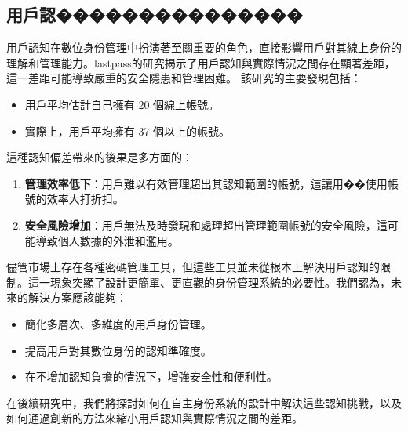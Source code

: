 \subsection{用戶認���������������}
用戶認知在數位身份管理中扮演著至關重要的角色，直接影響用戶對其線上身份的理解和管理能力。lastpass\cite{lastpass2020psychology}的研究揭示了用戶認知與實際情況之間存在顯著差距，這一差距可能導致嚴重的安全隱患和管理困難。\newline
該研究的主要發現包括：
\begin{itemize}
  \item 用戶平均估計自己擁有 20 個線上帳號。
  \item 實際上，用戶平均擁有 37 個以上的帳號。
\end{itemize}
這種認知偏差帶來的後果是多方面的：
\begin{enumerate}
  \item \textbf{管理效率低下}：用戶難以有效管理超出其認知範圍的帳號，這讓用��使用帳號的效率大打折扣。
  \item \textbf{安全風險增加}：用戶無法及時發現和處理超出管理範圍帳號的安全風險，這可能導致個人數據的外泄和濫用。
\end{enumerate}
儘管市場上存在各種密碼管理工具，但這些工具並未從根本上解決用戶認知的限制。這一現象突顯了設計更簡單、更直觀的身份管理系統的必要性。我們認為，未來的解決方案應該能夠：
\begin{itemize}
  \item 簡化多層次、多維度的用戶身份管理。
  \item 提高用戶對其數位身份的認知準確度。
  \item 在不增加認知負擔的情況下，增強安全性和便利性。
\end{itemize}
在後續研究中，我們將探討如何在自主身份系統的設計中解決這些認知挑戰，以及如何通過創新的方法來縮小用戶認知與實際情況之間的差距。
